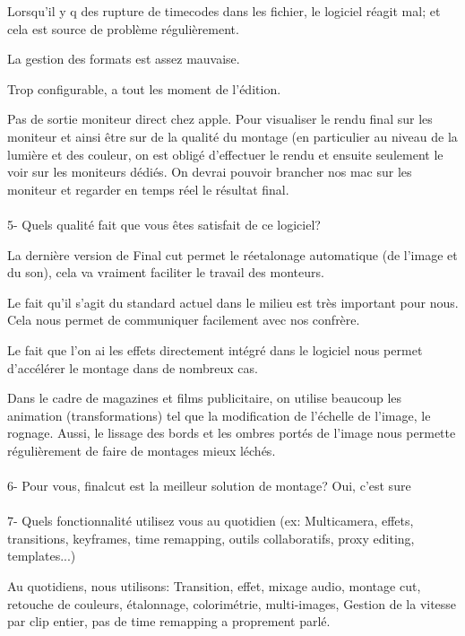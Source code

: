 Lorsqu'il y q des rupture de timecodes dans les fichier, le logiciel réagit mal;
et cela est source de problème régulièrement.

La gestion des formats est assez mauvaise.

Trop configurable, a tout les moment de l'édition.

Pas de sortie moniteur direct chez apple. Pour visualiser le rendu final sur les
moniteur et ainsi être sur de la qualité du montage (en particulier au niveau de
la lumière et des couleur, on est obligé d'effectuer le rendu et ensuite
seulement le voir sur les moniteurs dédiés. On devrai pouvoir brancher nos mac
sur les moniteur et regarder en temps réel le résultat final.

\paragraph{}
5- Quels qualité fait que vous êtes satisfait de ce logiciel?

La dernière version de Final cut permet le réetalonage automatique (de l'image
et du son), cela va vraiment faciliter le travail des monteurs.

Le fait qu'il s'agit du standard actuel dans le milieu est très important pour
nous. Cela nous permet de communiquer facilement avec nos confrère.

Le fait que l'on ai les effets directement intégré dans le logiciel nous
permet d'accélérer le montage dans de nombreux cas.

Dans le cadre de magazines et films publicitaire, on utilise beaucoup les
animation (transformations) tel que la modification de l'échelle de l'image,
le rognage. Aussi, le lissage des bords et les ombres portés de l'image nous
permette régulièrement de faire de montages mieux léchés.


\paragraph{}
6- Pour vous, finalcut est la meilleur solution de montage?
Oui, c'est sure

\paragraph{}
7-  Quels fonctionnalité utilisez vous au quotidien (ex: Multicamera, effets,
transitions, keyframes, time remapping, outils collaboratifs, proxy
editing, templates...)

Au quotidiens, nous utilisons: Transition, effet, mixage audio, montage cut,
retouche de couleurs, étalonnage, colorimétrie, multi-images, Gestion de la
vitesse par clip entier, pas de time remapping a proprement parlé.

